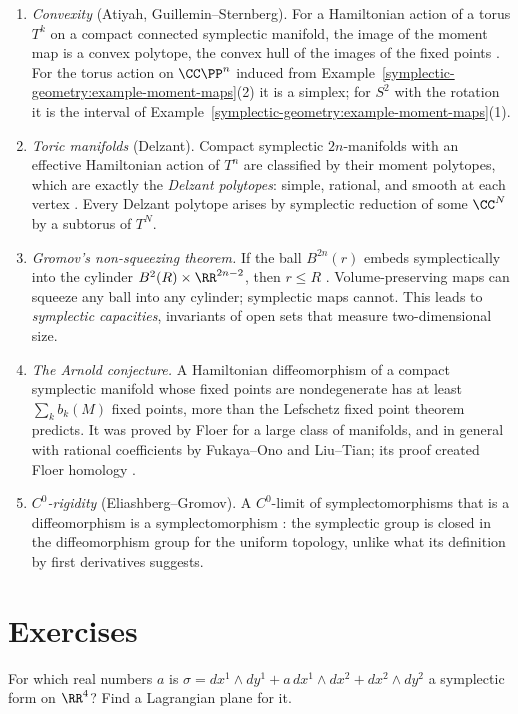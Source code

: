 \begin{enumerate}
\item \emph{Convexity} (Atiyah, Guillemin--Sternberg). For a Hamiltonian action of a torus $T^k$ on a compact connected symplectic manifold, the image of the moment map is a convex polytope, the convex hull of the images of
the fixed points \cite{cannas-da-silva}. For the torus action on $\CC\PP^{n}$ induced from Example~\ref{symplectic-geometry:example-moment-maps}(2) it is a simplex; for $S^2$ with the rotation it is the interval of
Example~\ref{symplectic-geometry:example-moment-maps}(1).
\item \emph{Toric manifolds} (Delzant). Compact symplectic $2n$-manifolds with an effective Hamiltonian action of $T^n$ are classified by their moment polytopes, which are exactly the \emph{Delzant polytopes}: simple,
rational, and smooth at each vertex \cite{cannas-da-silva}. Every Delzant polytope arises by symplectic reduction of some $\CC^N$ by a subtorus of $T^N$.
\item \emph{Gromov's non-squeezing theorem.} If the ball $B^{2n}(r)$ embeds symplectically into the cylinder $B^2(R) \times \RR^{2n-2}$, then $r \leq R$ \cite{mcduff-salamon}. Volume-preserving maps can squeeze any
ball into any cylinder; symplectic maps cannot. This leads to \emph{symplectic capacities}, invariants of open sets that measure two-dimensional size.
\item \emph{The Arnold conjecture.} A Hamiltonian diffeomorphism of a compact symplectic manifold whose fixed points are nondegenerate has at least $\sum_kb_k(M)$ fixed points, more than the Lefschetz fixed point theorem
predicts. It was proved by Floer for a large class of manifolds, and in general with rational coefficients by Fukaya--Ono and Liu--Tian; its proof created Floer homology \cite{mcduff-salamon}.
\item \emph{$C^0$-rigidity} (Eliashberg--Gromov). A $C^0$-limit of symplectomorphisms that is a diffeomorphism is a symplectomorphism \cite{mcduff-salamon}: the symplectic group is closed in the
diffeomorphism group for the uniform topology, unlike what its definition by first derivatives suggests.
\end{enumerate}

\section{Exercises}\label{symplectic-geometry:section-exercises}

\begin{exercise}\label{symplectic-geometry:exercise-nondegenerate-r4}
For which real numbers $a$ is $\sigma = dx^1 \wedge dy^1 + a\,dx^1 \wedge dx^2 + dx^2 \wedge dy^2$ a symplectic form on $\RR^4$? Find a Lagrangian plane for it.
\end{exercise}

